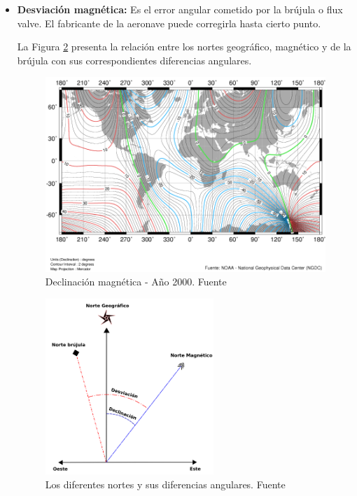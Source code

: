 \begin{itemize}
\item \textbf{Desviación magnética:} Es el error angular cometido por la brújula o flux valve. El fabricante de la aeronave puede corregirla hasta cierto punto.

La Figura \ref{fig:declinacion-desviacion} presenta la relación entre los nortes geográfico, magnético y de la brújula con sus correspondientes diferencias angulares.

\begin{figure}[!htb]
    \centering
\includegraphics[keepaspectratio,width=\textwidth]{06.radionavegacion/Imagenes/declinacion-magnetica-anio-2000.png}
\caption{Declinaci\'on magn\'etica - A\~no 2000. Fuente \protect\cite{Salazar_nav_aerea}}
\label{fig:declinacion-magnetica-anio-2000}
\end{figure}

\begin{figure}[!htb]
    \centering
\includegraphics[keepaspectratio,width=0.6\textwidth]{06.radionavegacion/Imagenes/declinacion-desviacion.png}
\caption{Los diferentes nortes y sus diferencias angulares. Fuente \protect\cite{Salazar_nav_aerea}}
\label{fig:declinacion-desviacion}
\end{figure}



\end{itemize}
